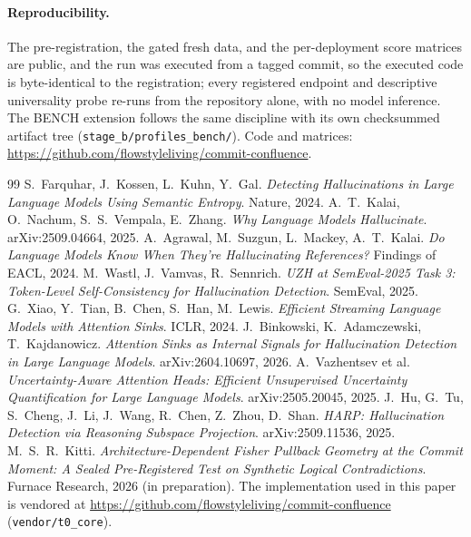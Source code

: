 \documentclass[11pt]{article}
\begin{document}
\paragraph{Reproducibility.} The pre-registration, the gated fresh data, and the per-deployment
score matrices are public, and the run was executed from a tagged commit, so the executed code is
byte-identical to the registration; every registered endpoint and descriptive universality probe
re-runs from the repository alone, with no model inference. The BENCH extension follows the same
discipline with its own checksummed artifact tree (\texttt{stage\_b/profiles\_bench/}). Code and
matrices: \url{https://github.com/flowstyleliving/commit-confluence}.

\FloatBarrier
\begingroup\footnotesize
\begin{thebibliography}{99}\setlength{\itemsep}{0pt}\setlength{\parskip}{0pt}
 S.~Farquhar, J.~Kossen, L.~Kuhn, Y.~Gal.
\emph{Detecting Hallucinations in Large Language Models Using Semantic Entropy}. Nature, 2024.
 A.~T.~Kalai, O.~Nachum, S.~S.~Vempala, E.~Zhang.
\emph{Why Language Models Hallucinate}. arXiv:2509.04664, 2025.
 A.~Agrawal, M.~Suzgun, L.~Mackey, A.~T.~Kalai.
\emph{Do Language Models Know When They're Hallucinating References?} Findings of EACL, 2024.
 M.~Wastl, J.~Vamvas, R.~Sennrich.
\emph{UZH at SemEval-2025 Task 3: Token-Level Self-Consistency for Hallucination Detection}.
SemEval, 2025.
 G.~Xiao, Y.~Tian, B.~Chen, S.~Han, M.~Lewis.
\emph{Efficient Streaming Language Models with Attention Sinks}. ICLR, 2024.
 J.~Binkowski, K.~Adamczewski, T.~Kajdanowicz.
\emph{Attention Sinks as Internal Signals for Hallucination Detection in Large Language Models}.
arXiv:2604.10697, 2026.
 A.~Vazhentsev et al.
\emph{Uncertainty-Aware Attention Heads: Efficient Unsupervised Uncertainty Quantification for
Large Language Models}. arXiv:2505.20045, 2025.
 J.~Hu, G.~Tu, S.~Cheng, J.~Li, J.~Wang, R.~Chen, Z.~Zhou, D.~Shan.
\emph{HARP: Hallucination Detection via Reasoning Subspace Projection}. arXiv:2509.11536, 2025.
 M.~S.~R.~Kitti.
\emph{Architecture-Dependent Fisher Pullback Geometry at the Commit Moment: A Sealed
Pre-Registered Test on Synthetic Logical Contradictions}. Furnace Research, 2026 (in preparation).
The implementation used in this paper is vendored at
\url{https://github.com/flowstyleliving/commit-confluence} (\texttt{vendor/t0\_core}).

\end{thebibliography}
\end{document}
